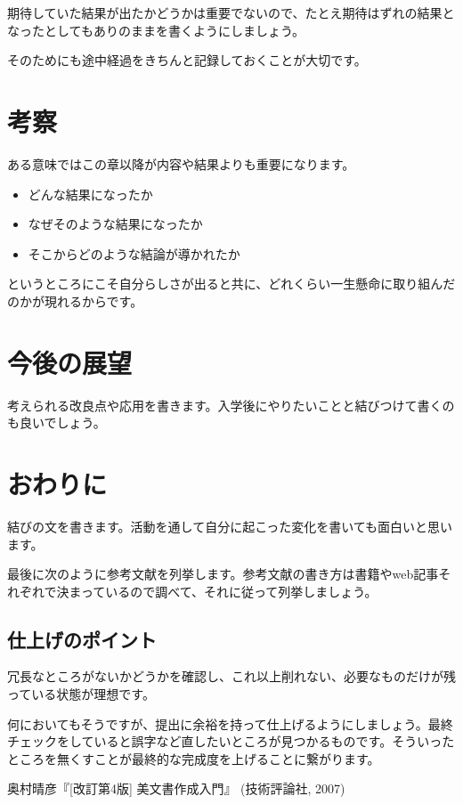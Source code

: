 \documentclass[dvipdfmx, a4paper]{jsarticle}
\begin{document}
期待していた結果が出たかどうかは重要でないので、たとえ期待はずれの結果となったとしてもありのままを書くようにしましょう。

そのためにも途中経過をきちんと記録しておくことが大切です。

\section{考察}
ある意味ではこの章以降が内容や結果よりも重要になります。
\begin{itemize}
    \item どんな結果になったか
    \item なぜそのような結果になったか
    \item そこからどのような結論が導かれたか
\end{itemize}
というところにこそ自分らしさが出ると共に、どれくらい一生懸命に取り組んだのかが現れるからです。

\section{今後の展望}
考えられる改良点や応用を書きます。入学後にやりたいことと結びつけて書くのも良いでしょう。

\section{おわりに}
結びの文を書きます。活動を通して自分に起こった変化を書いても面白いと思います。

最後に次のように参考文献を列挙します。参考文献の書き方は書籍やweb記事それぞれで決まっているので調べて、それに従って列挙しましょう。

\subsection{仕上げのポイント}
冗長なところがないかどうかを確認し、これ以上削れない、必要なものだけが残っている状態が理想です。

何においてもそうですが、提出に余裕を持って仕上げるようにしましょう。最終チェックをしていると誤字など直したいところが見つかるものです。そういったところを無くすことが最終的な完成度を上げることに繋がります。

\begin{thebibliography}{9}
\item
奥村晴彦『[改訂第4版] \LaTeXe 美文書作成入門』
(技術評論社, 2007)
\end{thebibliography}
\end{document}
